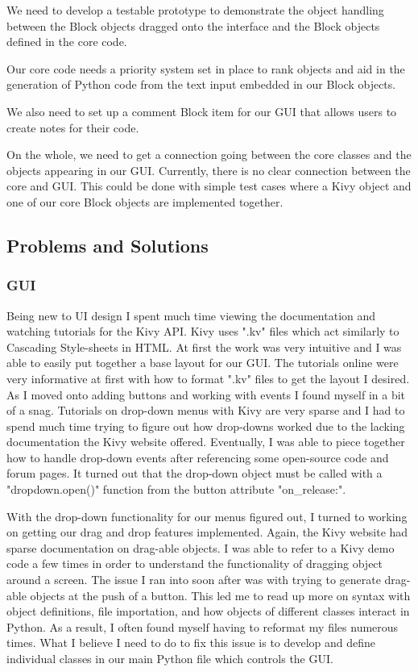 \documentclass[journal,10pt,onecolumn,compsoc]{IEEEtran} \usepackage[margin=1.0in]{geometry} \usepackage{pdfpages}
\begin{document}
\noindent We need to develop a testable prototype to demonstrate the object handling between the Block objects dragged onto the interface and the Block objects defined in the core code.

\noindent Our core code needs a priority system set in place to rank objects and aid in the generation of Python code from the text input embedded in our Block objects.

\noindent We also need to set up a comment Block item for our GUI that allows users to create notes for their code.

\noindent On the whole, we need to get a connection going between the core classes and the objects appearing in our GUI. 
Currently, there is no clear connection between the core and GUI. 
This could be done with simple test cases where a Kivy object and one of our core Block objects are implemented together.
\subsection{Problems and Solutions}
\subsubsection{GUI}
Being new to UI design I spent much time viewing the documentation and watching tutorials for the Kivy API.
Kivy uses ".kv" files which act similarly to Cascading Style-sheets in HTML.
At first the work was very intuitive and I was able to easily put together a base layout for our GUI.
The tutorials online were very informative at first with how to format ".kv" files to get the layout I desired.
As I moved onto adding buttons and working with events I found myself in a bit of a snag.
Tutorials on drop-down menus with Kivy are very sparse and I had to spend much time trying to figure out how drop-downs worked due to the lacking documentation the Kivy website offered.
Eventually, I was able to piece together how to handle drop-down events after referencing some open-source code and forum pages.
It turned out that the drop-down object must be called with a "dropdown.open()" function from the button attribute "on\_release:".

\noindent With the drop-down functionality for our menus figured out, I turned to working on getting our drag and drop features implemented.
Again, the Kivy website had sparse documentation on drag-able objects.
I was able to refer to a Kivy demo code a few times in order to understand the functionality of dragging object around a screen.
The issue I ran into soon after was with trying to generate drag-able objects at the push of a button.
This led me to read up more on syntax with object definitions, file importation, and how objects of different classes interact in Python.
As a result, I often found myself having to reformat my files numerous times.
What I believe I need to do to fix this issue is to develop and define individual classes in our main Python file which controls the GUI.
\end{document}
